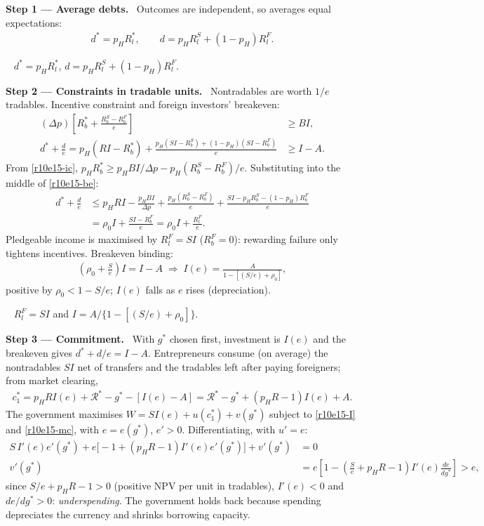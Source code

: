\documentclass[11pt,a4paper]{article}
\newcommand{\step}[2]{\par\medskip\noindent\textbf{Step #1 --- #2.}~}
\newcommand{\answer}[1]{\par\smallskip\noindent\fbox{\textbf{Answer\if\relax\detokenize{#1}\relax\else\ #1\fi.}}~}
\newcommand{\Rc}{\mathcal{R}}
\begin{document}
\step{1}{Average debts} Outcomes are independent, so averages equal expectations:
\begin{align}
  d^* = p_HR_l^*, \qquad d = p_HR_l^S+(1-p_H)R_l^F. \label{r10e15-d}
\end{align}

\answer{(i)} $d^*=p_HR_l^*$, $d=p_HR_l^S+(1-p_H)R_l^F$.

\step{2}{Constraints in tradable units} Nontradables are worth $1/e$ tradables. Incentive constraint and foreign investors' breakeven:
\begin{align}
  (\Delta p)\left[R_b^*+\frac{R_b^S-R_b^F}{e}\right] &\geq BI, \label{r10e15-ic}\\
  d^*+\frac de = p_H(RI-R_b^*)+\frac{p_H(SI-R_b^S)+(1-p_H)(SI-R_b^F)}{e} &\geq I-A. \label{r10e15-be}
\end{align}
From \eqref{r10e15-ic}, $p_HR_b^*\geq p_HBI/\Delta p-p_H(R_b^S-R_b^F)/e$. Substituting into the middle of \eqref{r10e15-be}:
\begin{align}
  d^*+\frac de &\leq p_HRI-\frac{p_HBI}{\Delta p}+\frac{p_H(R_b^S-R_b^F)}{e}+\frac{SI-p_HR_b^S-(1-p_H)R_b^F}{e} \nonumber\\
  &= \rho_0I+\frac{SI-R_b^F}{e} = \rho_0I+\frac{R_l^F}{e}. \label{r10e15-pl}
\end{align}
Pledgeable income is maximised by $R_l^F=SI$ ($R_b^F=0$): rewarding failure only tightens incentives. Breakeven binding:
\begin{align}
  \left(\rho_0+\frac Se\right)I = I-A \;\Longrightarrow\; I(e) = \frac{A}{1-[(S/e)+\rho_0]}, \label{r10e15-I}
\end{align}
positive by $\rho_0<1-S/e$; $I(e)$ falls as $e$ rises (depreciation).

\answer{(ii)} $R_l^F=SI$ and $I=A/\{1-[(S/e)+\rho_0]\}$.

\step{3}{Commitment} With $g^*$ chosen first, investment is $I(e)$ and the breakeven gives $d^*+d/e=I-A$. Entrepreneurs consume (on average) the nontradables $SI$ net of transfers and the tradables left after paying foreigners; from market clearing,
\begin{align}
  c_1^* = p_HRI(e)+\Rc^*-g^*-[I(e)-A] = \Rc^*-g^*+(p_HR-1)I(e)+A. \label{r10e15-mc}
\end{align}
The government maximises $W=SI(e)+u(c_1^*)+v(g^*)$ subject to \eqref{r10e15-I} and \eqref{r10e15-mc}, with $e=e(g^*)$, $e'>0$. Differentiating, with $u'=e$:
\begin{align}
  S\,I'(e)e'(g^*)+e\bigl[-1+(p_HR-1)I'(e)e'(g^*)\bigr]+v'(g^*) &= 0 \nonumber\\
  v'(g^*) &= e\left[1-\left(\frac Se+p_HR-1\right)I'(e)\frac{de}{dg^*}\right]>e, \label{r10e15-c}
\end{align}
since $S/e+p_HR-1>0$ (positive NPV per unit in tradables), $I'(e)<0$ and $de/dg^*>0$: \emph{underspending}. The government holds back because spending depreciates the currency and shrinks borrowing capacity.
\end{document}
